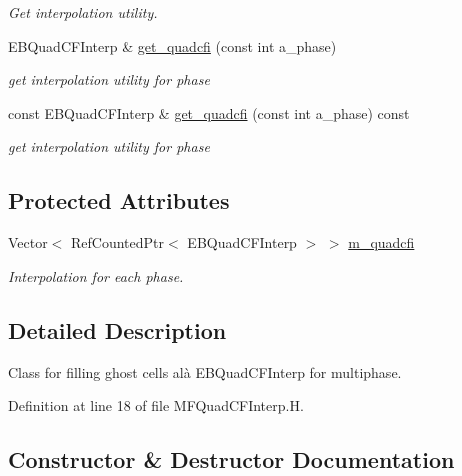 \begin{DoxyCompactItemize}
\begin{DoxyCompactList}\small\item\em Get interpolation utility. \end{DoxyCompactList}\item 
E\+B\+Quad\+C\+F\+Interp \& \hyperlink{classMFQuadCFInterp_a74fa4dd2ca9438e7a0a60365f6610440}{get\+\_\+quadcfi} (const int a\+\_\+phase)
\begin{DoxyCompactList}\small\item\em get interpolation utility for phase \end{DoxyCompactList}\item 
const E\+B\+Quad\+C\+F\+Interp \& \hyperlink{classMFQuadCFInterp_a353747811296cb79e0f3498ed1749e23}{get\+\_\+quadcfi} (const int a\+\_\+phase) const 
\begin{DoxyCompactList}\small\item\em get interpolation utility for phase \end{DoxyCompactList}\end{DoxyCompactItemize}
\subsection*{Protected Attributes}
\begin{DoxyCompactItemize}
\item 
Vector$<$ Ref\+Counted\+Ptr$<$ E\+B\+Quad\+C\+F\+Interp $>$ $>$ \hyperlink{classMFQuadCFInterp_a7f778e3c58dc248231b0a01f715127e6}{m\+\_\+quadcfi}
\begin{DoxyCompactList}\small\item\em Interpolation for each phase. \end{DoxyCompactList}\end{DoxyCompactItemize}


\subsection{Detailed Description}
Class for filling ghost cells alà E\+B\+Quad\+C\+F\+Interp for multiphase. 

Definition at line 18 of file M\+F\+Quad\+C\+F\+Interp.\+H.



\subsection{Constructor \& Destructor Documentation}
